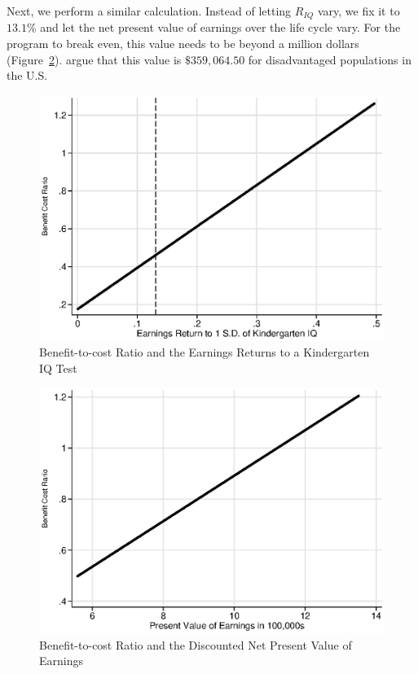 \noindent Next, we perform a similar calculation. Instead of letting $R_{IQ}$ vary, we fix it to $13.1\%$ and let the net present value of earnings over the life cycle vary. For the program to break even, this value needs to be beyond a million dollars (Figure~\ref{figuresecond}). \citet{Kline-Walters_2015_NBER-Evaluating} argue that this value is $\$359,064.50$ for disadvantaged populations in the U.S.

\begin{center}
\begin{figure}[H] 
\caption{Benefit-to-cost Ratio and the Earnings Returns to a Kindergarten IQ Test} \label{figure:first}
\centering
\includegraphics[width=.65\columnwidth]{Output/abc_chettytype_return.eps}
\end{figure}
\end{center}

\begin{center}
\begin{figure}[H] 
\caption{Benefit-to-cost Ratio and the Discounted Net Present Value of Earnings}
\label{figuresecond}
\centering
\includegraphics[width=.65\columnwidth]{Output/abc_chettytype_pv.eps}
\end{figure}
\end{center}